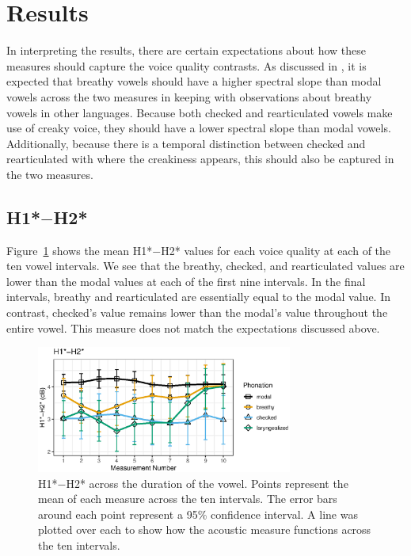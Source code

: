 \section{Results} \label{sec:Results}

In interpreting the results, there are certain expectations about how these measures should capture the voice quality contrasts. As discussed in \citet{garellekPhoneticsVoice2019}, it is expected that breathy vowels should have a higher spectral slope than modal vowels across the two measures in keeping with observations about breathy vowels in other languages. Because both checked and rearticulated vowels make use of creaky voice, they should have a lower spectral slope than modal vowels. Additionally, because there is a temporal distinction between checked and rearticulated with where the creakiness appears, this should also be captured in the two measures. 

\subsection{H1*$-$H2*} \label{sec:H1H2}

Figure~\ref{fig:FIG1} shows the mean H1*$-$H2* values for each voice quality at each of the ten vowel intervals. We see that the breathy, checked, and rearticulated values are lower than the modal values at each of the first nine intervals. In the final intervals, breathy and rearticulated are essentially equal to the modal value. In contrast, checked's value remains lower than the modal's value throughout the entire vowel. This measure does not match the expectations discussed above.

\begin{figure}[htbp]
  \centering
  \includegraphics[width = 0.75\textwidth]{images/Figure1.eps}
  \caption{\label{fig:FIG1}{H1*$-$H2* across the duration of the vowel. Points represent the mean of each measure across the ten intervals. The error bars around each point represent a 95\% confidence interval. A line was plotted over each to show how the acoustic measure functions across the ten intervals.}}
\end{figure}


